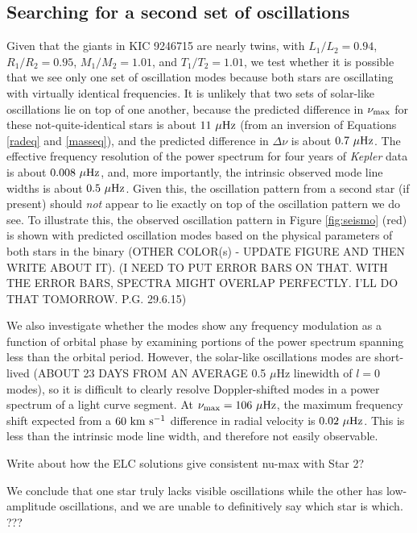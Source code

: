 \subsection{Searching for a second set of oscillations}

Given that the giants in KIC 9246715 are nearly twins, with $L_1/L_2 = 0.94$, $R_1/R_2 = 0.95$, $M_1/M_2 = 1.01$, and $T_1/T_2 = 1.01$, we test whether it is possible that we see only one set of oscillation modes because both stars are oscillating with virtually identical frequencies. It is unlikely that two sets of solar-like oscillations lie on top of one another, because the predicted difference in $\nu_{\rm{max}}$ for these not-quite-identical stars is about $11 \ \mu \rm{Hz}$ (from an inversion of Equations \ref{radeq} and \ref{masseq}), and the predicted difference in $\Delta \nu$ is about $0.7 \ \mu \rm{Hz}$. The effective frequency resolution of the power spectrum for four years of \emph{Kepler} data is about $0.008 \ \mu \rm{Hz}$, and, more importantly, the intrinsic observed mode line widths is about $0.5 \ \mu \rm{Hz}$.
Given this, the oscillation pattern from a second star (if present) should \emph{not} appear to lie exactly on top of the oscillation pattern we do see. To illustrate this, the observed oscillation pattern in Figure \ref{fig:seismo} (red) is shown with predicted oscillation modes based on the physical parameters of both stars in the binary (OTHER COLOR(s) - UPDATE FIGURE AND THEN WRITE ABOUT IT). (I NEED TO PUT ERROR BARS ON THAT. WITH THE ERROR BARS, SPECTRA MIGHT OVERLAP PERFECTLY. I'LL DO THAT TOMORROW. P.G. 29.6.15)

We also investigate whether the modes show any frequency modulation as a function of orbital phase by examining portions of the power spectrum spanning less than the orbital period. However, the solar-like oscillations modes are short-lived (ABOUT 23 DAYS FROM AN AVERAGE 0.5 $\mu$Hz linewidth of $l=0$ modes), so it is difficult to clearly resolve Doppler-shifted modes in a power spectrum of a light curve segment. At $\nu_{\rm{max}} = 106 \ \mu \rm{Hz}$, the maximum frequency shift expected from a $60 \ \rm{km} \ \rm{s}^{-1}$ difference in radial velocity is $0.02 \ \mu \rm{Hz}$. This is less than the intrinsic mode line width, and therefore not easily observable.

Write about how the ELC solutions give consistent nu-max with Star 2?

We conclude that one star truly lacks visible oscillations while the other has low-amplitude oscillations, and we are unable to definitively say which star is which. ???
    
    
    
    
    
    
  
  
